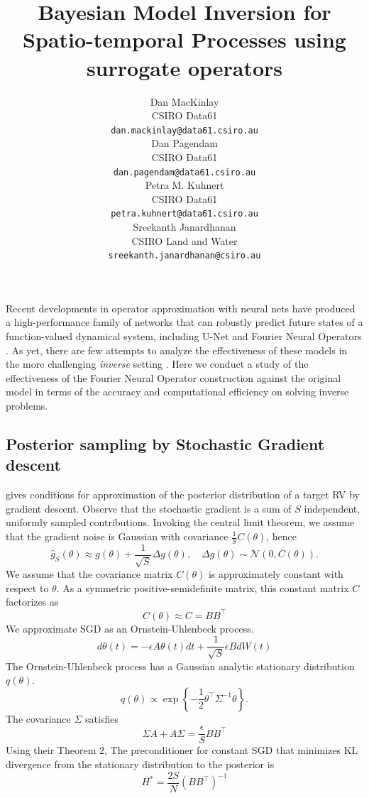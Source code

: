 \documentclass{article}
\title{Bayesian Model Inversion for Spatio-temporal Processes using surrogate operators}
\author{%
  Dan MacKinlay\\
  CSIRO Data61\\
  \texttt{dan.mackinlay@data61.csiro.au} \\
   \And
   Dan Pagendam \\
   CSIRO Data61 \\
  \texttt{dan.pagendam@data61.csiro.au} \\
   \And
   Petra M. Kuhnert \\
   CSIRO Data61 \\
   \texttt{petra.kuhnert@data61.csiro.au} \\
   Sreekanth Janardhanan\\
   CSIRO Land and Water \\
   \texttt{sreekanth.janardhanan@csiro.au} \\
}
\begin{document}
\maketitle

\begin{abstract}

\end{abstract}

Recent developments in operator approximation with neural nets have produced a high-performance family of networks that can robustly predict future states of a function-valued dynamical system, including U-Net \cite{RonnebergerUNet2015} and Fourier Neural Operators \cite{LiFourier2020,KovachkiNeural2021}.
As yet, there are few attempts to analyze the effectiveness of these models in the more challenging \emph{inverse} setting \cite{MacKinlayModel2021}.
Here we conduct a study of the effectiveness of the Fourier Neural Operator construction against the original model in terms of the accuracy and computational efficiency on solving inverse problems.


 \subsection{Posterior sampling by Stochastic Gradient descent}

\cite{MandtStochastic2017} gives conditions for approximation of the posterior distribution of a target RV by gradient descent.
Observe that the stochastic gradient is a sum of \(S\) independent, uniformly sampled contributions. Invoking the central limit theorem, we assume that the gradient noise is Gaussian with covariance \(\frac{1}{S} C(\theta)\), hence
\[
\hat{g}_S(\theta) \approx g(\theta)+\frac{1}{\sqrt{S}} \Delta g(\theta), \quad \Delta g(\theta) \sim \mathcal{N}(0, C(\theta)) .
\]
We assume that the covariance matrix \(C(\theta)\) is approximately constant with respect to \(\theta\).
As a symmetric positive-semidefinite matrix, this constant matrix \(C\) factorizes as
\[
C(\theta) \approx C=B B^{\top}
\]
We approximate SGD as an Ornstein-Uhlenbeck process.
\[
d \theta(t)=-\epsilon A \theta(t) d t+\frac{1}{\sqrt{S}} \epsilon B d W(t)
\]
The Ornstein-Uhlenbeck process has a Gaussian analytic stationary distribution \(q(\theta)\).
\[
q(\theta) \propto \exp \left\{-\frac{1}{2} \theta^{\top} \Sigma^{-1} \theta\right\} .
\]
The covariance \(\Sigma\) satisfies
\[
\Sigma A+A \Sigma=\frac{\epsilon}{S} B B^{\top}
\]
Using their Theorem 2, The preconditioner for constant SGD that minimizes KL divergence from the stationary distribution to the posterior is
\[
H^*=\frac{2 S}{N}\left(B B^{\top}\right)^{-1}
\]
\end{document}
